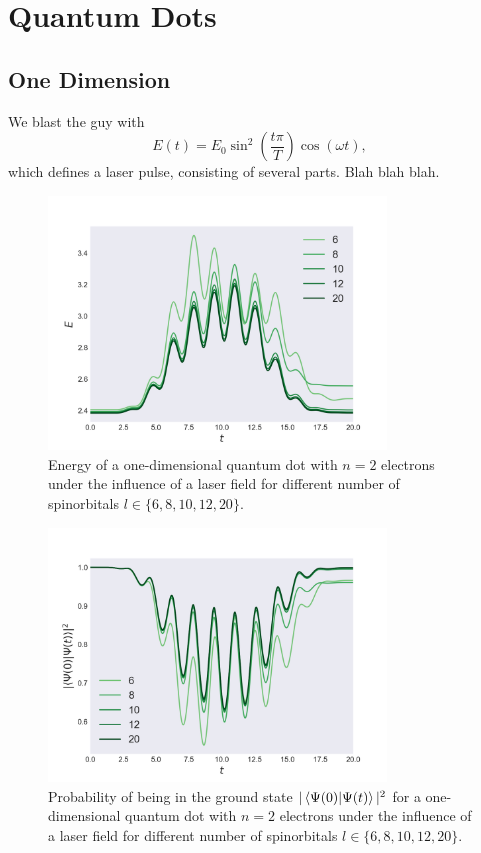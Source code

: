 \chapter{Quantum Dots}

\section{One Dimension}

We blast the guy with 
\begin{equation}
    E(t) = E_0\sin^2\left(\frac{t\pi}{T}\right)\cos(\omega t),
\end{equation}
which defines a laser pulse, consisting of several parts. Blah blah blah.

\begin{figure}
    \centering
    \includegraphics[width=0.8\textwidth]{results/figures/1D/n=2energy.png} 
    \caption{Energy of a one-dimensional quantum dot with $n=2$ electrons
        under the influence of a laser field for different number of spinorbitals
        $l\in\{6,8,10,12,20\}$.
    }
    \label{fig:1d_n2_E}
\end{figure}

\begin{figure}
    \centering
    \includegraphics[width=0.8\textwidth]{results/figures/1D/n=2overlap.png} 
    \caption{Probability of being in the ground state $|\braket*{\Psi(0)}{\Psi(t)}|^2$
        for a one-dimensional quantum dot with $n=2$ electrons under 
        the influence of a laser field for different number of spinorbitals 
        $l\in\{6,8,10,12,20\}$.
    }
    \label{fig:1d_n2_overlap}
\end{figure}


